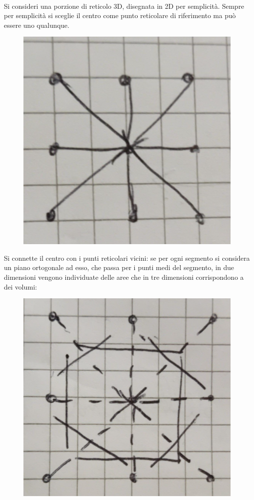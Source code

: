 \documentclass{book}
\begin{document}
        \paragraph{}
            Si consideri una porzione di reticolo 3D, disegnata in 2D per semplicità. Sempre per semplicità si sceglie il centro come punto reticolare di riferimento ma può essere uno qualunque.
            \begin{figure}[h!]
                \centering
                \includegraphics[width=0.35\linewidth]{img/reticoloLez8.png}
                \label{reticoloLez8}
            \end{figure}

            Si connette il centro con i punti reticolari vicini: se per ogni segmento si considera un piano ortogonale ad esso, che passa per i punti medi del segmento, in due dimensioni vengono individuate delle aree che in tre dimensioni corrispondono a dei volumi:
            \begin{figure}[h!]
                \centering
                \includegraphics[width=0.35\linewidth]{img/reticolo2Lez8.png}
                \label{fig:enter-label}
            \end{figure}
\end{document}

